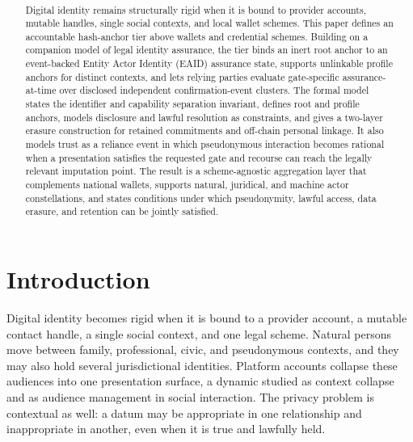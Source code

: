 \documentclass[oneside,10pt]{swissi}
\title{\papertitle \\[0.35em]
\normalsize \papersubtitle}
\author{{\fontsize{8}{10}\selectfont\paperauthors}\\[0.9em]
{\scriptsize\paperaffiliations}}
\date{\vspace{1.5em}}
\begin{document}
\maketitle

\begin{abstract}
Digital identity remains structurally rigid when it is bound to provider accounts, mutable handles, single social contexts, and local wallet schemes. This paper defines an accountable hash-anchor tier above wallets and credential schemes. Building on a companion model of legal identity assurance, the tier binds an inert root anchor to an event-backed Entity Actor Identity (EAID) assurance state, supports unlinkable profile anchors for distinct contexts, and lets relying parties evaluate gate-specific assurance-at-time over disclosed independent confirmation-event clusters. The formal model states the identifier and capability separation invariant, defines root and profile anchors, models disclosure and lawful resolution as constraints, and gives a two-layer erasure construction for retained commitments and off-chain personal linkage. It also models trust as a reliance event in which pseudonymous interaction becomes rational when a presentation satisfies the requested gate and recourse can reach the legally relevant imputation point. The result is a scheme-agnostic aggregation layer that complements national wallets, supports natural, juridical, and machine actor constellations, and states conditions under which pseudonymity, lawful access, data erasure, and retention can be jointly satisfied.
\end{abstract}


\bigskip

\section{Introduction}

Digital identity becomes rigid when it is bound to a provider account, a mutable contact handle, a single social context, and one legal scheme. Natural persons move between family, professional, civic, and pseudonymous contexts, and they may also hold several jurisdictional identities. Platform accounts collapse these audiences into one presentation surface, a dynamic studied as context collapse and as audience management in social interaction.\cite{marwick2011contextcollapse,goffman1959presentation} The privacy problem is contextual as well: a datum may be appropriate in one relationship and inappropriate in another, even when it is true and lawfully held.\cite{nissenbaum2010privacy}
\end{document}
